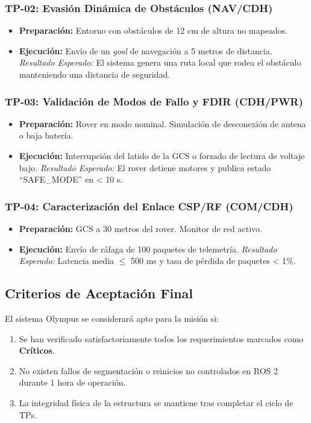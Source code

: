 \subsubsection{TP-02: Evasión Dinámica de Obstáculos (NAV/CDH)}
\begin{itemize}
    \item \textbf{Preparación:} Entorno con obstáculos de 12 cm de altura no mapeados.
    \item \textbf{Ejecución:} Envío de un \textit{goal} de navegación a 5 metros de distancia.
    \textit{Resultado Esperado:} El sistema genera una ruta local que rodea el obstáculo manteniendo una distancia de seguridad.
\end{itemize}

\subsubsection{TP-03: Validación de Modos de Fallo y FDIR (CDH/PWR)}
\begin{itemize}
    \item \textbf{Preparación:} Rover en modo nominal. Simulación de desconexión de antena o baja batería.
    \item \textbf{Ejecución:} Interrupción del latido de la GCS o forzado de lectura de voltaje bajo.
    \textit{Resultado Esperado:} El rover detiene motores y publica estado ``SAFE\_MODE'' en < 10 s.
\end{itemize}

\subsubsection{TP-04: Caracterización del Enlace CSP/RF (COM/CDH)}
\begin{itemize}
    \item \textbf{Preparación:} GCS a 30 metros del rover. Monitor de red activo.
    \item \textbf{Ejecución:} Envío de ráfaga de 100 paquetes de telemetría.
    \textit{Resultado Esperado:} Latencia media $\le$ 500 ms y tasa de pérdida de paquetes < 1\%.
\end{itemize}

\subsection{Criterios de Aceptación Final}
El sistema Olympus se considerará apto para la misión si:
\begin{enumerate}
    \item Se han verificado satisfactoriamente todos los requerimientos marcados como \textbf{Críticos}.
    \item No existen fallos de segmentación o reinicios no controlados en ROS 2 durante 1 hora de operación.
    \item La integridad física de la estructura se mantiene tras completar el ciclo de TPs.
\end{enumerate}
